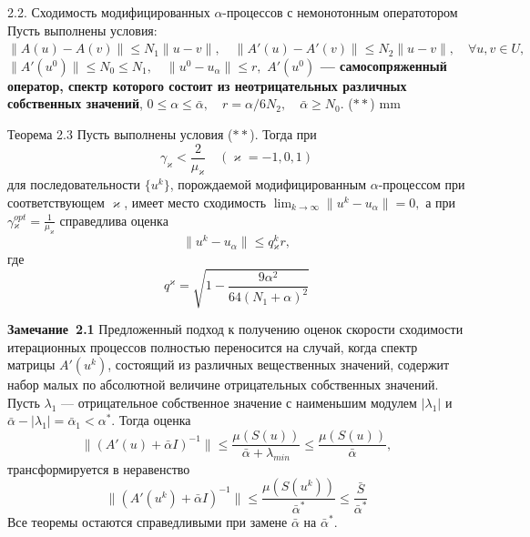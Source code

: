 \documentclass[10pt,pdf, mathserif, hyperref={unicode}]{beamer}
\begin{document}
\begin{frame}{\small 2.2. Сходимость модифицированных $\alpha$-процессов с немонотонным оператотором}
	Пусть выполнены условия:
	$\|A(u)-A(v)\|\leqslant N_1\|u-v\|, \quad \|A'(u)-A'(v)\|\leqslant N_2\|u-v\|, \quad \forall u, v \in U,$
	$\|A'(u^0)\| \leqslant N_0\leqslant N_1, \quad \|u^0-u_\alpha\| \leqslant r,$
	{\textbf{\color{blue}$A'(u^0)$ --- самосопряженный оператор, спектр которого состоит из неотрицательных различных собственных значений}}, 
	$0\leqslant\alpha\leqslant\bar{\alpha}, \quad r=\alpha/6N_2, \quad \bar{\alpha}\geqslant N_0.$ ($**$)
	 mm	
	\begin{block}{Теорема 2.3}
		Пусть выполнены условия ($**$). Тогда при
		$$\gamma _\varkappa <\frac{2}{\mu _\varkappa}\quad (\varkappa=-1,0,1)$$
		для последовательности $\{u^k\}$, порождаемой модифицированным $\alpha$-процессом при соответствующем $\varkappa$, имеет место сходимость $\lim_{k\to\infty}\|u^k-u_\alpha\|=0, $ а при 
		$\gamma{_\varkappa^{opt}}=\frac{1}{\mu_\varkappa}$
		справедлива оценка $$\|u^k-u_\alpha\|\leqslant q{_\varkappa^k}r,$$ где
		$$q^\varkappa=\sqrt{1-\frac{9\alpha^2}{64(N_1+\alpha)^2}}$$
	\end{block}
\end{frame}

\begin{frame}
	\begin{block}{\bf Замечание~2.1} Предложенный подход к получению оценок скорости сходимости итерационных процессов полностью переносится на случай, когда спектр матрицы $A'(u^k)$, состоящий из различных вещественных значений, содержит набор малых по абсолютной величине отрицательных собственных значений. Пусть $\lambda _1$ --- отрицательное собственное значение с наименьшим модулем $|\lambda_1|$ и $\bar\alpha -|\lambda _1|=\bar\alpha _1<\alpha^*$. Тогда оценка 
		$$\|(A'(u)+\bar\alpha I)^{-1}\|\leqslant \frac{\mu (S(u))}{\bar\alpha+\lambda_{min}} \leqslant \frac{\mu(S(u))}{\bar\alpha},$$ 
		трансформируется в неравенство
		$$\|(A'(u^k)+\bar\alpha I)^{-1}\|\leqslant\frac{\mu(S(u^k))}{\bar\alpha^*}\leqslant\frac{\bar S}{\bar\alpha^*}$$
		Все теоремы остаются справедливыми при замене $\bar\alpha$ на $\bar\alpha^*$.
	\end{block}
\end{frame}
\end{document}
